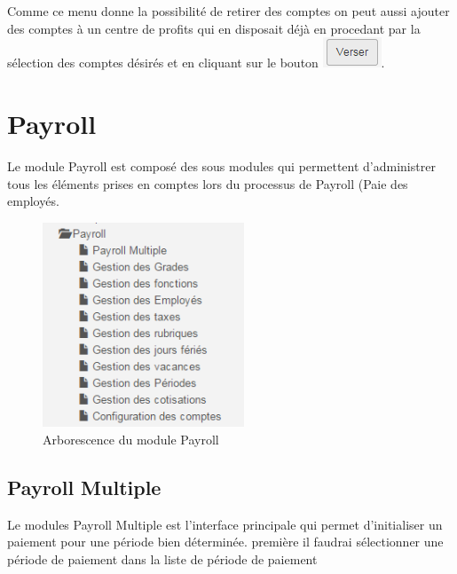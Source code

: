 \documentclass[12pt,a4paper]{report}
\begin{document}
Comme ce menu donne la possibilité de retirer des comptes on peut aussi ajouter des comptes à un centre de profits qui en disposait déjà en procedant par la sélection des comptes désirés et en cliquant sur le bouton \includegraphics[scale=0.7]{pic/VerserCompte.png}.



\newpage
\chapter{Payroll}        
Le module Payroll est composé des sous modules qui permettent d'administrer tous les éléments prises en comptes lors du processus de Payroll (Paie des employés.

\begin{figure}[h]
\begin{center}
\includegraphics[width=6cm]{pic/PayrollArbo.png}
\end{center}
\caption{Arborescence du module Payroll}
\label{Arborescence du module Payroll}
\end{figure}

\section{Payroll Multiple}
Le modules Payroll Multiple est l'interface principale qui permet d'initialiser un paiement pour une période bien déterminée.
première il faudrai sélectionner une période de paiement dans la liste de période de paiement
\end{document}
